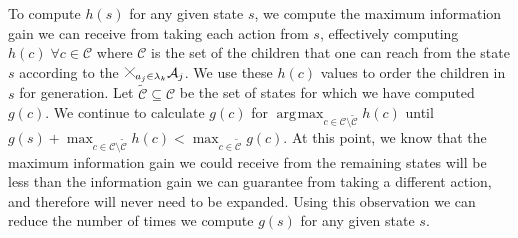 \documentclass[letterpaper, 10 pt, conference]{IEEEConference}
\DeclareMathOperator*{\argmax}{\arg\!\max}
\newcommand{\cross}{%
  \begin{tikzpicture}[scale=0.25]
    \draw (0,0) -- (1,1); %
    \draw (0,1) -- (1,0); %
  \end{tikzpicture}%
}
\begin{document}
To compute $h(s)$ for any given state $s$, we compute the maximum information gain we can receive from taking each action from $s$, effectively computing $h(c) \; \forall c \in \mathcal{C}$ where $\mathcal{C}$ is the set of the children that one can reach from the state $s$ according to the $\cross_{a_j \in \lambda_k} \mathcal{A}_j$. We use these $h(c)$ values to order the children in $s$ for generation. Let $\tilde{\mathcal{C}} \subseteq \mathcal{C}$ be the set of states for which we have computed $g(c)$. We continue to calculate $g(c)$ for $\argmax_{ c \in \mathcal{C} \setminus \tilde{\mathcal{C}}} h(c)$ until $g(s) + \max_{ c \in \mathcal{C} \setminus \tilde{\mathcal{C}}} h(c) < \max_{c \in \tilde{\mathcal{C}}} g(c)$. At this point, we know that the maximum information gain we could receive from the remaining states will be less than the information gain we can guarantee from taking a different action, and therefore will never need to be expanded. Using this observation we can reduce the number of times we compute $g(s)$ for any given state $s$. 


\end{document}
